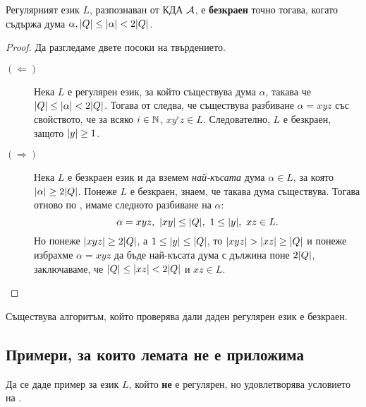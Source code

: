 \begin{prop}
  Регулярният език $L$, 
  разпознаван от КДА $\mathcal{A}$, е {\bf безкраен} точно тогава, когато съдържа дума $\alpha, \lvert{Q}\rvert \leq \lvert{\alpha}\rvert < 2\lvert{Q}\rvert$.
\end{prop}
\begin{proof}
  Да разгледаме двете посоки на твърдението.
  \begin{description}
  \item[$(\Leftarrow)$]
    Нека $L$ е регулярен език, за който съществува дума $\alpha$, такава че $\lvert{Q}\rvert \leq \lvert{\alpha}\rvert < 2\lvert{Q}\rvert$.
    Тогава от  следва, че съществува разбиване $\alpha = xyz$ със свойството, че
    за всяко $i \in \mathbb{N}$, $xy^iz \in L$. Следователно, $L$ е безкраен, защото $\lvert{y}\rvert \geq 1$.
  \item[$(\Rightarrow)$]
    Нека $L$ е безкраен език и %
    да вземем {\em най-късата} дума $\alpha \in L$, за която $\lvert{\alpha}\rvert \geq 2\lvert{Q}\rvert$.
    Понеже $L$ е безкраен, знаем, че такава дума съществува.
    Тогава отново по , имаме следното разбиване на $\alpha$:
    \[\alpha = xyz,\ \abs{xy} \leq \abs{Q},\ 1\leq \abs{y},\ xz \in L.\]
    Но понеже $\lvert{xyz}\rvert \geq 2\lvert{Q}\rvert$, а $1 \leq \lvert{y}\rvert \leq \lvert{Q}\rvert$, то $\lvert{xyz}\rvert > \lvert{xz}\rvert \geq \lvert{Q}\rvert$ и понеже избрахме $\alpha = xyz$
    да бъде най-късата дума с дължина поне $2\lvert{Q}\rvert$, заключаваме, че $\lvert{Q}\rvert \leq \lvert{xz}\rvert < 2\lvert{Q}\rvert$ и $xz \in L$.
  \end{description}
\end{proof}

\begin{cor}
  Съществува алгоритъм, който проверява дали даден регулярен език е безкраен.
\end{cor}


\subsection*{Примери, за които лемата не е  приложима}

\begin{problem}
  Да се даде пример за език $L$, който {\bf не} е регулярен, но удовлетворява
  условието на .
\end{problem}


